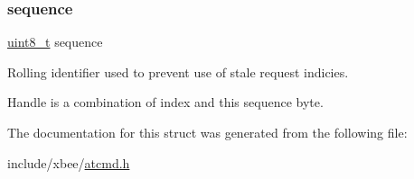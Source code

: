 \subsubsection{\texorpdfstring{sequence}{sequence}}
{\footnotesize\ttfamily \hyperlink{group__hal__dos_gae1affc9ca37cfb624959c866a73f83c2}{uint8\+\_\+t} sequence}



Rolling identifier used to prevent use of stale request indicies. 

Handle is a combination of index and this sequence byte. 

The documentation for this struct was generated from the following file\+:\begin{DoxyCompactItemize}
\item 
include/xbee/\hyperlink{atcmd_8h}{atcmd.\+h}\end{DoxyCompactItemize}

